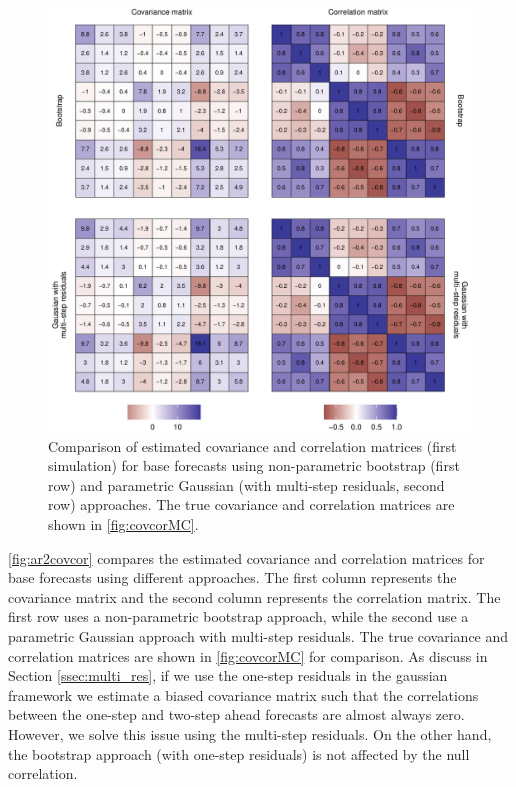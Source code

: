\documentclass[a4paper,11pt]{article}
\theoremstyle{definition}
\begin{document}
\begin{figure}[!t]
	\centering
	\includegraphics[width = 0.9\linewidth]{fig/simAR/base_cov.pdf}
	\caption{Comparison of estimated covariance and correlation matrices (first simulation) for base forecasts using non-parametric bootstrap (first row) and parametric Gaussian (with multi-step residuals, second row) approaches. The true covariance and correlation matrices are shown in \autoref{fig:covcorMC}.}
	\label{fig:ar2covcor}
\end{figure}

\autoref{fig:ar2covcor} compares the estimated covariance and correlation matrices for base forecasts using different approaches. The first column represents the covariance matrix and the second column represents the correlation matrix. The first row uses a non-parametric bootstrap approach, while the second use a parametric Gaussian approach with multi-step residuals. 
The true covariance and correlation matrices are shown in \autoref{fig:covcorMC} for comparison. As discuss in Section \ref{ssec:multi_res}, if we use the one-step residuals in the gaussian framework we estimate a biased covariance matrix such that the correlations between the one-step and two-step ahead forecasts are almost always zero. However, we solve this issue using the multi-step residuals. On the other hand, the bootstrap approach (with one-step residuals) is not affected by the null correlation.
\end{document}
